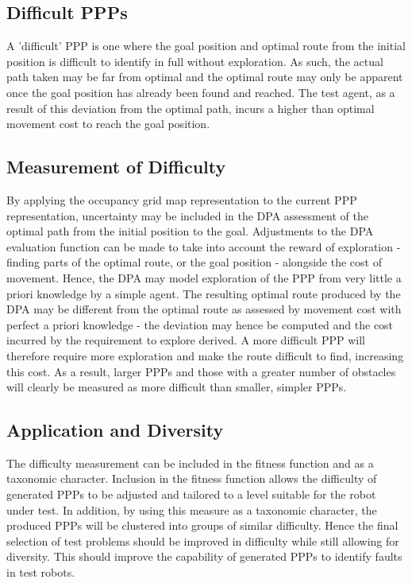 \documentclass[authoryearcitations]{UoYCSproject}
\begin{document}
\subsection{Difficult PPPs}
\label{sec:pa3_difficult}
A 'difficult' PPP is one where the goal position and optimal route from the initial position is difficult to identify in full without exploration. As such, the actual path taken may be far from optimal and the optimal route may only be apparent once the goal position has already been found and reached. The test agent, as a result of this deviation from the optimal path, incurs a higher than optimal movement cost to reach the goal position.

\subsection{Measurement of Difficulty}
\label{sec:pa3_measurement}
By applying the occupancy grid map representation to the current PPP representation, uncertainty may be included in the DPA assessment of the optimal path from the initial position to the goal. Adjustments to the DPA evaluation function can be made to take into account the reward of exploration - finding parts of the optimal route, or the goal position - alongside the cost of movement. Hence, the DPA may model exploration of the PPP from very little a priori knowledge by a simple agent. The resulting optimal route produced by the DPA may be different from the optimal route as assessed by movement cost with perfect a priori knowledge - the deviation may hence be computed and the cost incurred by the requirement to explore derived. A more difficult PPP will therefore require more exploration and make the route difficult to find, increasing this cost. As a result, larger PPPs and those with a greater number of obstacles will clearly be measured as more difficult than smaller, simpler PPPs.

\subsection{Application and Diversity}
\label{sec:pa3_app_div}
The difficulty measurement can be included in the fitness function and as a taxonomic character. Inclusion in the fitness function allows the difficulty of generated PPPs to be adjusted and tailored to a level suitable for the robot under test. In addition, by using this measure as a taxonomic character, the produced PPPs will be clustered into groups of similar difficulty. Hence the final selection of test problems should be improved in difficulty while still allowing for diversity. This should improve the capability of generated PPPs to identify faults in test robots.
\end{document}
